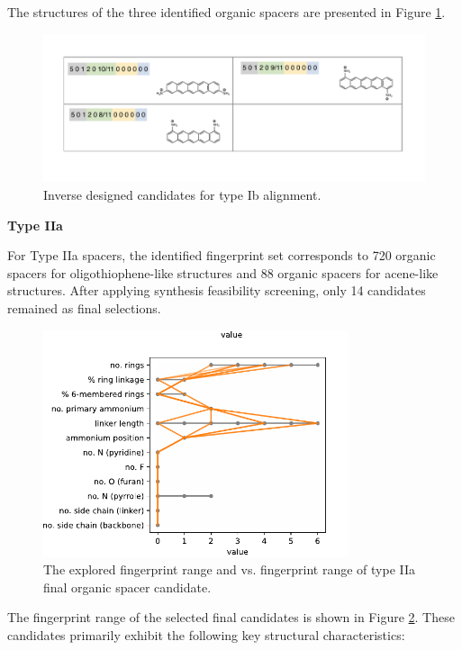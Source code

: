 The structures of the three identified organic spacers are presented in Figure \ref{fig:figure5.15}.

\begin{figure}[htbp]
    \centering
    \includegraphics[width=\textwidth]{figures/synthesis-feasibility/figure5-15.pdf}
    \caption{Inverse designed candidates for type Ib alignment.}
    \label{fig:figure5.15}
\end{figure}

\textbf{Type IIa}

For Type IIa spacers, the identified fingerprint set corresponds to 720 organic spacers for oligothiophene-like structures and 88 organic spacers for acene-like structures. After applying synthesis feasibility screening, only 14 candidates remained as final selections.

\begin{figure}[htbp]
    \centering
    \includegraphics[width=0.8\textwidth]{figures/synthesis-feasibility/figure5-16.pdf}
    \caption{The explored fingerprint range and vs. fingerprint range of type IIa final organic spacer candidate.}
    \label{fig:figure5.16}
\end{figure}

The fingerprint range of the selected final candidates is shown in Figure \ref{fig:figure5.16}. These candidates primarily exhibit the following key structural characteristics:

